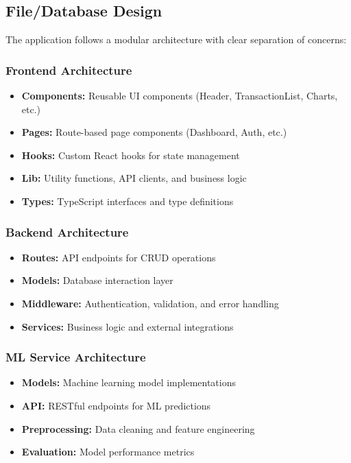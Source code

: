 \documentclass[12pt,a4paper]{article}
\begin{document}
\subsection{File/Database Design}

The application follows a modular architecture with clear separation of concerns:

\subsubsection{Frontend Architecture}
\begin{itemize}
    \item \textbf{Components:} Reusable UI components (Header, TransactionList, Charts, etc.)
    \item \textbf{Pages:} Route-based page components (Dashboard, Auth, etc.)
    \item \textbf{Hooks:} Custom React hooks for state management
    \item \textbf{Lib:} Utility functions, API clients, and business logic
    \item \textbf{Types:} TypeScript interfaces and type definitions
\end{itemize}

\subsubsection{Backend Architecture}
\begin{itemize}
    \item \textbf{Routes:} API endpoints for CRUD operations
    \item \textbf{Models:} Database interaction layer
    \item \textbf{Middleware:} Authentication, validation, and error handling
    \item \textbf{Services:} Business logic and external integrations
\end{itemize}

\subsubsection{ML Service Architecture}
\begin{itemize}
    \item \textbf{Models:} Machine learning model implementations
    \item \textbf{API:} RESTful endpoints for ML predictions
    \item \textbf{Preprocessing:} Data cleaning and feature engineering
    \item \textbf{Evaluation:} Model performance metrics
\end{itemize}
\end{document}
